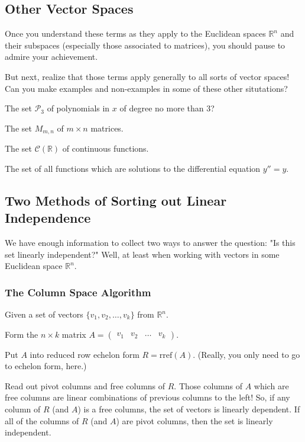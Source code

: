 \documentclass[11pt]{amsart}
\theoremstyle{definition}
\begin{document}
\subsection{Other Vector Spaces}

Once you understand these terms as they apply to the Euclidean spaces $\mathbb{R}^n$ and their subspaces (especially those associated to matrices), you should pause to admire your achievement.

But next, realize that those terms apply generally to all sorts of vector spaces! Can you make examples and non-examples in some of these other situtations?
\begin{compactitem}
\item The set $\mathcal{P}_3$ of polynomials in $x$ of degree no more than 3?
\item The set $M_{m,n}$ of $m\times n$ matrices.
\item The set $\mathcal{C}(\mathbb{R})$ of continuous functions.
\item The set of all functions which are solutions to the differential equation $y'' = y$.
\end{compactitem}


\subsection{Two Methods of Sorting out Linear Independence}

We have enough information to collect two ways to answer the question: "Is this set linearly independent?"
Well, at least when working with vectors in some Euclidean space $\mathbb{R}^n$.

\subsubsection{The Column Space Algorithm}
Given a set of vectors $\{v_1, v_2, \ldots, v_k\}$ from $\mathbb{R}^n$.
\begin{compactenum}
\item Form the $n\times k$ matrix $A = \left( \begin{smallmatrix} v_1 & v_2 & \dots & v_k\end{smallmatrix}\right)$.
\item Put $A$ into reduced row echelon form $R = \mathrm{rref}(A)$. (Really, you only need to go to echelon form, here.)
\item Read out pivot columns and free columns of $R$. Those columns of $A$ which are free columns are linear combinations of previous columns to the left! So, if any column of $R$ (and $A$) is a free columns, the set of vectors is linearly dependent. If all of the columns of $R$ (and $A$) are pivot columns, then the set is linearly independent.
\end{compactenum}
\end{document}
